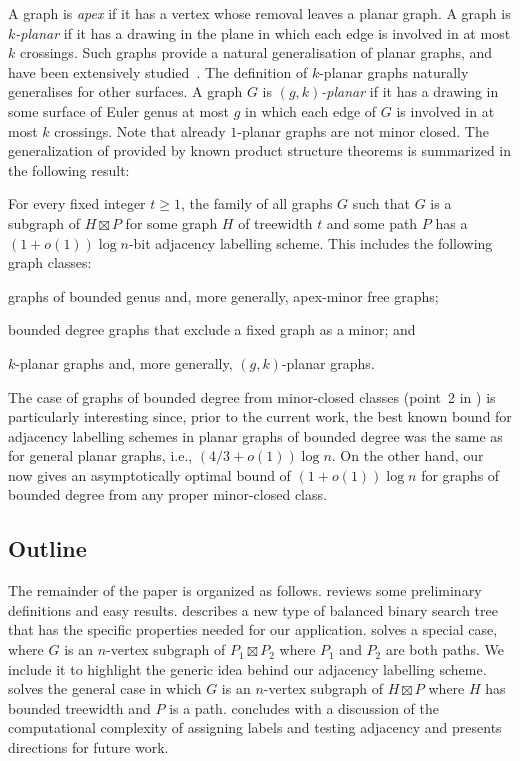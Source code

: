 \documentclass[kpfonts]{patmorin}
\let\geq\geqslant
\begin{document}
A graph is \emph{apex} if it has a vertex whose removal leaves a planar graph.
A graph is \emph{$k$-planar} if it has a drawing in the plane in which
each edge is involved in at most $k$ crossings. Such graphs provide a natural
generalisation of planar graphs, and have been extensively studied~\cite{kobourov.liotta.ea:annotated}.
The definition of $k$-planar graphs naturally generalises for other surfaces. A graph $G$ is
\emph{$(g,k)$-planar} if it has a drawing in some surface of Euler genus at most
$g$ in which each edge of $G$ is involved in at most $k$ crossings.
Note that already $1$-planar graphs are not minor closed.
The generalization of  provided by known product structure theorems is summarized in the following result:

\begin{thm}
  For every fixed integer $t\geq 1$, the family of all graphs $G$ such that $G$ is a subgraph of $H\boxtimes P$ for some graph $H$ of treewidth $t$ and some path $P$ has a $(1+o(1))\log n$-bit adjacency labelling scheme.
  This includes the following graph classes:
  \begin{compactenum}
    \item graphs of bounded genus and, more generally, apex-minor free graphs;
    \item bounded degree graphs that exclude a fixed graph as a minor; and
    \item $k$-planar graphs and, more generally, $(g,k)$-planar graphs.
  \end{compactenum}
\end{thm}

The case of graphs of bounded degree from minor-closed classes (point~2 in ) is particularly interesting since, prior to the current work, the best known bound for adjacency labelling schemes in planar graphs of bounded degree was the same as for general planar graphs, i.e., $(4/3+o(1))\log n$. On the other hand, our  now gives an asymptotically optimal bound of $(1+o(1))\log n$ for graphs of bounded degree from any proper minor-closed class.




\subsection{Outline}

The remainder of the paper is organized as follows.  reviews some preliminary definitions and easy results.   describes a new type of balanced binary search tree that has the specific properties needed for our application.  solves a special case, where $G$ is an $n$-vertex subgraph of $P_1\boxtimes P_2$ where $P_1$ and $P_2$ are both paths. We include it to highlight the generic idea behind our adjacency labelling scheme.  solves the general case in which $G$ is an $n$-vertex subgraph of $H\boxtimes P$ where $H$ has bounded treewidth and $P$ is a path.   concludes with a discussion of the computational complexity of assigning labels and testing adjacency and presents directions for future work.
\end{document}
